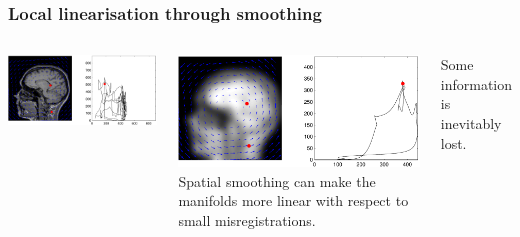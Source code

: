 \documentclass{beamer}
\begin{document}
\begin{frame}
\frametitle{Local linearisation through smoothing}
\begin{columns}[c]
\includegraphics[width=\textwidth]{manifold_unsmoothed}\par
\includegraphics[width=\textwidth]{manifold_smoothed}
Spatial smoothing can make the manifolds more linear with respect to small misregistrations.

Some information is inevitably lost.
\end{columns}
\end{frame}
\end{document}

